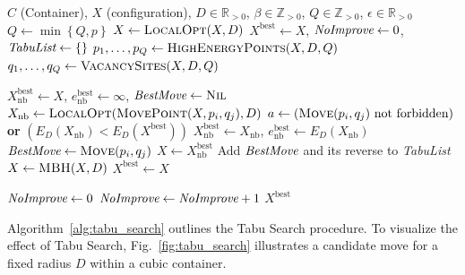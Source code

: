 \documentclass[preprint,12pt]{elsarticle}
\theoremstyle{remark}
\def \Z {\mathbb{Z}}
\def \R {\mathbb{R}}
\newcommand{\set}[1]{\left\{ #1 \right\}}
\begin{document}
\begin{algorithm}[H]
  \caption{Tabu Search}
  \begin{algorithmic}[1]
    \Require $C$ (Container), $X$ (configuration), $D \in \R_{> 0}$,
    $\beta \in \Z_{> 0}$, $Q \in \Z_{> 0}$, $\epsilon \in \R_{> 0}$
    \State $Q \gets \min \set{Q, p}$
    \State $X \gets \textsc{LocalOpt}(X, D)$
    \State $X^{\text{best}} \gets X$, $\emph{NoImprove} \gets 0$,
    $\emph{TabuList} \gets \set{}$
    \State $p_1, \dots, p_Q \gets \textsc{HighEnergyPoints}(X, D, Q)$
    \State $q_1, \dots, q_Q \gets \textsc{VacancySites}(X, D, Q)$

    \State $X^{\text{best}}_{\text{nb}} \gets X$,
    $e^{\text{best}}_{\text{nb}} \gets \infty$,
    $\emph{BestMove} \gets \textsc{Nil}$
    \State $X_{\text{nb}} \gets
    \textsc{LocalOpt}(\textsc{MovePoint}(X, p_i, q_j), D)$
    \State $a \gets \left(\textsc{Move}(p_i, q_j) \text{ not forbidden}\right)$
    \textbf{or} $\left(E_D(X_{\text{nb}}) < E_D(X^{\text{best}})\right)$
    \State $X^{\text{best}}_{\text{nb}} \gets X_{\text{nb}}$,
    $e^{\text{best}}_{\text{nb}} \gets E_D(X_{\text{nb}})$
    \State $\emph{BestMove} \gets \textsc{Move}(p_i, q_j)$
    \EndIf
    \EndFor
    \State $X \gets X^{\text{best}}_{\text{nb}}$
    \State Add $\emph{BestMove}$ and its reverse to \emph{TabuList}
    \EndIf
    \State $X \gets \textsc{MBH}(X, D)$ \label{line:mbh}
    \State $X^{\text{best}} \gets X$

    \State $\emph{NoImprove} \gets 0$
    \Else
    \State $\emph{NoImprove} \gets \emph{NoImprove} + 1$
    \EndIf
    \EndWhile
    \State \Return $X^{\text{best}}$
  \end{algorithmic}
  \label{alg:tabu_search}
\end{algorithm}

Algorithm~\ref{alg:tabu_search} outlines the Tabu Search procedure. To visualize
the effect of Tabu Search, Fig.~\ref{fig:tabu_search} illustrates a candidate
move for a fixed radius $D$ within a cubic container.
\end{document}

